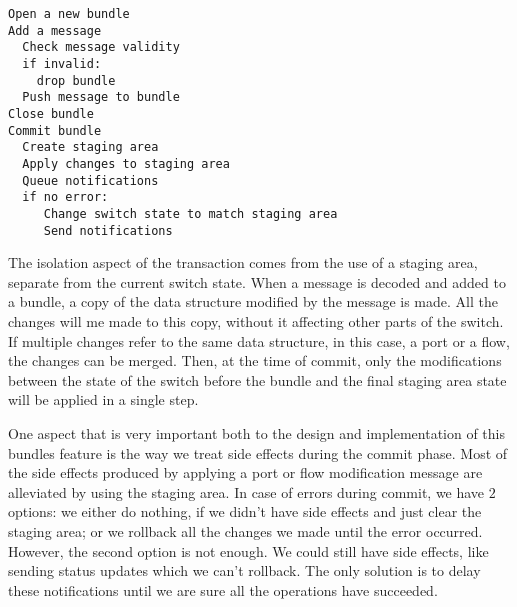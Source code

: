 \pagebreak
\begin{lstlisting}[caption={Basic Commit Algorithm}, label=code:alg]
Open a new bundle
Add a message
  Check message validity
  if invalid:
    drop bundle
  Push message to bundle
Close bundle
Commit bundle
  Create staging area
  Apply changes to staging area
  Queue notifications
  if no error:
     Change switch state to match staging area
     Send notifications
\end{lstlisting}

The isolation aspect of the transaction comes from the use of a staging area, separate from the current switch state.
When a message is decoded and added to a bundle, a copy of the data structure modified by the message is made.
All the changes will me made to this copy, without it affecting other parts of the switch. If multiple changes refer to
the same data structure, in this case, a port or a flow, the changes can be merged. Then, at the time of commit, only
the modifications between the state of the switch before the bundle and the final staging area state will be applied
in a single step.

One aspect that is very important both to the design and implementation of this bundles feature is the way we
treat side effects during the commit phase. Most of the side effects produced by applying a port or flow modification
message are alleviated by using the staging area. In case of errors during commit, we have $2$ options: we either do
nothing, if we didn't have side effects and just clear the staging area; or we rollback all the changes we made until
the error occurred. However, the second option is not enough. We could still have side effects, like sending status updates
which we can't rollback. The only solution is to delay these notifications until we are sure all the operations have
succeeded.




